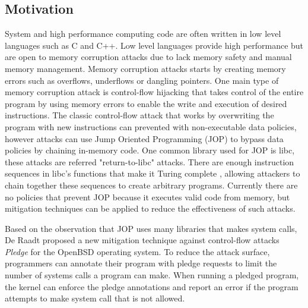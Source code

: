 \subsection{Motivation}

System and high performance computing code are often written in low level languages such as C and C++. Low level languages provide high performance but are open to memory corruption attacks due to lack memory safety and manual memory management. Memory corruption attacks \cite{Szekeres_2013} starts by creating memory errors such as overflows, underflows or dangling pointers. One main type of memory corruption attack is control-flow hijacking that takes control of the entire program by using memory errors to enable the write and execution of desired instructions. The classic control-flow attack that works by overwriting the program with new instructions can prevented with non-executable data policies, however attacks can use Jump Oriented Programming (JOP) to bypass data policies by chaining in-memory code. One common library used for JOP is libc, these attacks are referred "return-to-libc" attacks. There are enough instruction sequences in libc's functions that make it Turing complete \cite{Tran_2011}, allowing attackers to chain together these sequences to create arbitrary programs. Currently there are no policies that prevent JOP because it executes valid code from memory, but mitigation techniques \cite{Li_2010, Pappas_2012, pledge} can be applied to reduce the effectiveness of such attacks.

Based on the observation that JOP uses many libraries that makes system calls, De Raadt proposed a new mitigation technique against control-flow attacks \textit{Pledge}\cite{pledge} for the OpenBSD operating system. To reduce the attack surface, programmers can annotate their program with pledge\cite{pledge2} requests to limit the number of systems calls a program can make. When running a pledged program, the kernel can enforce the pledge annotations and report an error if the program attempts to make system call that is not allowed. 